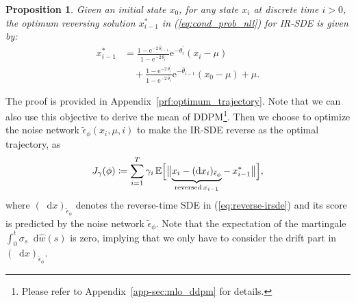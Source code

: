 \documentclass{article}
\newcommand{\diff}{\mathop{}\!\mathrm{d}}
\newcommand{\expp}{\mathrm{e}}
\theoremstyle{plain}
\newtheorem{proposition}[theorem]{Proposition}
\theoremstyle{definition}
\theoremstyle{remark}
\begin{document}
\begin{proposition}
    Given an initial state ${x}_0$, for any state ${x}_i$ at discrete time $i > 0$, the optimum reversing solution ${x}_{i-1}^{*}$ in (\ref{eq:cond_prob_nll}) for IR-SDE is given by:
\begin{equation}
    \begin{split}
        {x}_{i-1}^{*} &= \frac{1 - \expp^{-2 \, \bar{\theta}_{i-1}}}{1 - \expp^{-2 \, \bar{\theta}_i}} \expp^{-\theta_i^{'}} ({x}_i - \mu) \\[.6em]
        &\quad+ \frac{1 - \expp^{-2 \, \theta_i^{'}}}{1 - \expp^{-2 \, \bar{\theta}_i}} \expp^{-\bar{\theta}_{i-1}} ({x}_0 - \mu) + \mu.
    \end{split}
    \end{equation}
\end{proposition}
The proof is provided in Appendix~\ref{prf:optimum_trajectory}. Note that we can also use this objective to derive the mean of DDPM\footnote{Please refer to Appendix~\ref{app-sec:mlo_ddpm} for details.}.
Then we choose to optimize the noise network $\tilde{\epsilon}_{\phi}({x}_i, \mu, i)$ to make the IR-SDE reverse as the optimal trajectory, as
\begin{equation}
    {J}_{\gamma}(\phi) \coloneqq \sum_{i=1}^T \gamma_{i} \, \mathbb{E} \Bigl[ \bigl\lVert \underbrace{{x}_{i} - (\diff {x}_{i})_{\tilde{\epsilon}_\phi}}_{\mathrm{reversed} \, {x}_{i-1}} - \, {x}_{i-1}^{*} \bigr\rVert \Bigr],
    \label{eq:nll_objective}
\end{equation}
where $(\diff {x})_{\tilde{\epsilon}_\phi}$ denotes the reverse-time SDE in (\ref{eq:reverse-irsde}) and its score is predicted by the noise network $\tilde{\epsilon}_\phi$. Note that the expectation of the martingale $\int^t_0 \sigma_s \diff \hat{w}(s)$ is zero, implying that we only have to consider the drift part in $(\diff {x})_{\tilde{\epsilon}_\phi}$.
\end{document}
